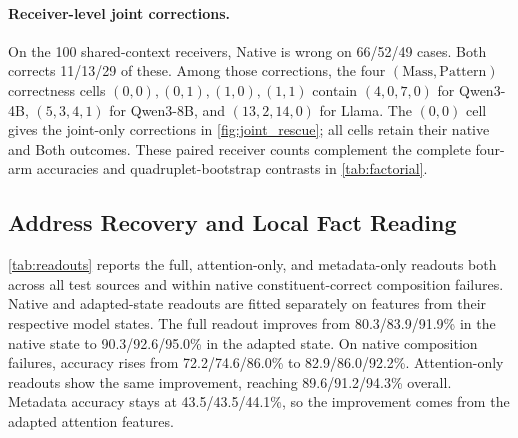 \begin{table}[!htbp]
  \centering
  \caption{\textbf{Factorial effects on shared-context composition.} Accuracy differences in percentage points with 95\% paired percentile intervals from 2,000 resamples of the 25 quadruplets. All 100 composed receivers remain in every condition. The interaction in \cref{eq:interaction} measures the change in the direct-query pattern effect after access calibration.}
  \label{tab:factorial}
  \small\setlength{\tabcolsep}{4pt}
  
\end{table}

\paragraph{Receiver-level joint corrections.} On the 100 shared-context receivers, Native is wrong on 66/52/49 cases. Both corrects 11/13/29 of these. Among those corrections, the four $(\mathrm{Mass},\mathrm{Pattern})$ correctness cells $(0,0),(0,1),(1,0),(1,1)$ contain $(4,0,7,0)$ for Qwen3-4B, $(5,3,4,1)$ for Qwen3-8B, and $(13,2,14,0)$ for Llama. The $(0,0)$ cell gives the joint-only corrections in \cref{fig:joint_rescue}; all cells retain their native and Both outcomes. These paired receiver counts complement the complete four-arm accuracies and quadruplet-bootstrap contrasts in \cref{tab:factorial}.

\subsection{Address Recovery and Local Fact Reading}

\cref{tab:readouts} reports the full, attention-only, and metadata-only readouts both across all test sources and within native constituent-correct composition failures. Native and adapted-state readouts are fitted separately on features from their respective model states. The full readout improves from 80.3/83.9/91.9\% in the native state to 90.3/92.6/95.0\% in the adapted state. On native composition failures, accuracy rises from 72.2/74.6/86.0\% to 82.9/86.0/92.2\%. Attention-only readouts show the same improvement, reaching 89.6/91.2/94.3\% overall. Metadata accuracy stays at 43.5/43.5/44.1\%, so the improvement comes from the adapted attention features.

\begin{table}[!htbp]
  \centering
  \caption{\textbf{Paragraph-address readout diagnostics.} Accuracy (\%) of training-fitted readouts. ``Failure subset'' is fixed by the native model: both constituents are correct and the composition is wrong. Native-state rows distinguish attention information from paragraph-length/title cues; adapted-state rows use the deployed model's own features. A common intercept would cancel in the paragraph softmax, so each readout has no bias parameter.}
  \label{tab:readouts}
  \small\setlength{\tabcolsep}{6pt}
  
\end{table}

